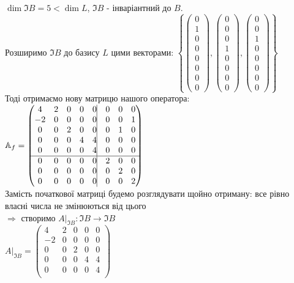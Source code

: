 \documentclass[a4paper, 10pt]{article}
\theoremstyle{theoremdd}
\theoremstyle{theoremdd}
\theoremstyle{theoremdd}
\theoremstyle{theoremdd}
\theoremstyle{theoremdd}
\theoremstyle{theoremdd}
\theoremstyle{theoremdd}
\theoremstyle{theoremdd}
\begin{document}
$\dim \Im B = 5 < \dim L$, $\Im B$ - інваріантний до $B$.\\
Розширимо $\Im B$ до базису $L$ цими векторами: $\left\{ \begin{pmatrix} 0 \\ 1 \\ 0 \\ 0 \\ 0 \\ 0 \\ 0 \\ 0 \end{pmatrix}, \begin{pmatrix} 0 \\ 0 \\ 0 \\ 1 \\ 0 \\ 0 \\ 0 \\ 0 \end{pmatrix}, \begin{pmatrix} 0 \\ 0 \\ 1 \\ 0 \\ 0 \\ 0 \\ 0 \\ 0 \end{pmatrix} \right\}$\\
Тоді отримаємо нову матрицю нашого оператора:\\
$\mathbb{A}_f = \begin{pmatrix}
4 & 2 & 0 & 0 & 0 \vline & 0 & 0 & 0\\
-2 & 0 & 0 & 0 & 0 \vline & 0 & 0 & 1 \\
0 & 0 & 2 & 0 & 0 \vline & 0 & 1 & 0 \\
0 & 0 & 0 & 4 & 4 \vline & 0 & 0 & 0\\
0 & 0 & 0 & 0 & 4 \vline & 0 & 0 & 0\\
\hline
0 & 0 & 0 & 0 & 0 \vline & 2 & 0 & 0\\
0 & 0 & 0 & 0 & 0 \vline & 0 & 2 & 0 \\
0 & 0 & 0 & 0 & 0 \vline & 0 & 0 & 2\\
\end{pmatrix}$\\
Замість початкової матриці будемо розглядувати щойно отриману: все рівно власні числа не змінюються від цього\\
$\Rightarrow$ створимо $A|_{\Im B}: \Im B \to \Im B$\\
$A|_{\Im B} = \begin{pmatrix}
4 & 2 & 0 & 0 & 0 \\
-2 & 0 & 0 & 0 & 0 \\
0 & 0 & 2 & 0 & 0 \\
0 & 0 & 0 & 4 & 4 \\
0 & 0 & 0 & 0 & 4 \\
\end{pmatrix}$
\newpage
\end{document}
